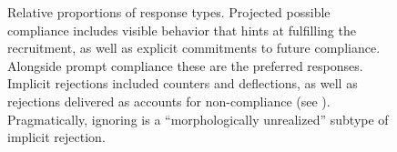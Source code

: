 \documentclass[output=paper,nonflat,colorlinks,citecolor=brown]{langsci/langscibook}
\begin{document}
\begin{figure}

\caption{Relative proportions of response types. Projected possible compliance includes visible behavior that hints at fulfilling the recruitment, as well as explicit commitments to future compliance. Alongside prompt compliance these are the preferred responses. Implicit rejections included counters and deflections, as well as rejections delivered as accounts for non-compliance (see ). Pragmatically, ignoring is a “morphologically unrealized” subtype of implicit rejection.}
\label{fig:blythe:12}
\end{figure}
\end{document}

